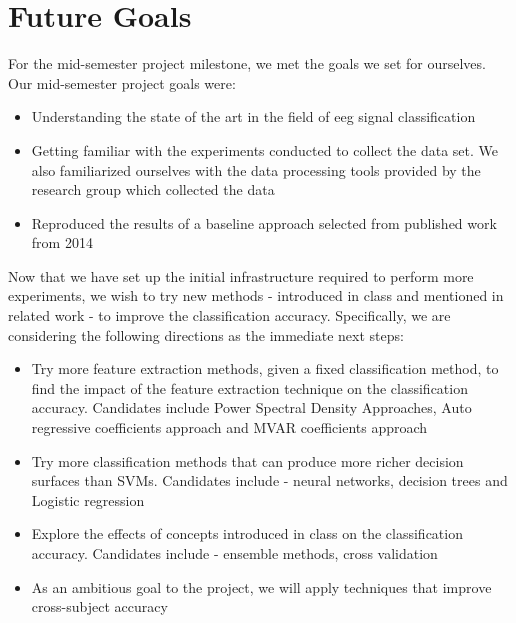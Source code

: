\documentclass{article} %
\begin{document}
\section{Future Goals}

For the mid-semester project milestone, we met the goals we set for ourselves. Our mid-semester project goals were:
\begin{itemize}
\item Understanding the state of the art in the field of eeg signal classification
\item Getting familiar with the experiments conducted to collect the data set. We also familiarized ourselves with the data processing tools provided by the research group which collected the data
\item Reproduced the results of a baseline approach selected from published work from 2014
\end{itemize}

Now that we have set up the initial infrastructure required to perform more experiments, we wish to try new methods - introduced in class and mentioned in related work - to improve the classification accuracy. Specifically, we are considering the following directions as the immediate next steps:
\begin{itemize}
\item Try more feature extraction methods, given a fixed classification method, to find the impact of the feature extraction technique on the classification accuracy. Candidates include Power Spectral Density Approaches, Auto regressive coefficients approach and MVAR coefficients approach
\item Try more classification methods that can produce more richer decision surfaces than SVMs. Candidates include - neural networks, decision trees and Logistic regression
\item Explore the effects of concepts introduced in class on the classification accuracy. Candidates include - ensemble methods, cross validation
\item As an ambitious goal to the project, we will apply techniques that improve cross-subject accuracy 
\end{itemize}




\end{document}
